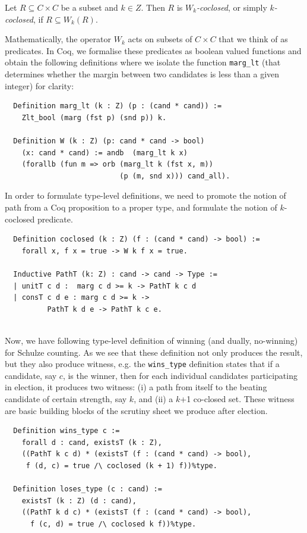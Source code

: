 \begin{definition} Let $R \subseteq C \times C$ be a subset and $k \in
Z$. Then $R$ is \emph{$W_k$-coclosed}, or simply
\emph{$k$-coclosed}, if $R \subseteq W_k(R)$.
\end{definition}

\noindent
Mathematically, the operator $W_k$ acts on subsets of $C \times C$
that we think of as predicates. In Coq, we formalise these
predicates as boolean valued functions and obtain the following
definitions where we isolate the function \texttt{marg\_lt} (that
determines whether the margin between two candidates is less than a
given integer) for clarity:


\begin{verbatim}
  Definition marg_lt (k : Z) (p : (cand * cand)) :=
    Zlt_bool (marg (fst p) (snd p)) k.

  Definition W (k : Z) (p: cand * cand -> bool) 
    (x: cand * cand) := andb  (marg_lt k x)
    (forallb (fun m => orb (marg_lt k (fst x, m)) 
                           (p (m, snd x))) cand_all).
\end{verbatim}

\noindent
In order to formulate type-level definitions, we need to promote the
notion of path from a Coq proposition to a proper type, and
formulate the notion of $k$-coclosed predicate.

\begin{verbatim} 
  Definition coclosed (k : Z) (f : (cand * cand) -> bool) :=
    forall x, f x = true -> W k f x = true.

  Inductive PathT (k: Z) : cand -> cand -> Type :=
  | unitT c d :  marg c d >= k -> PathT k c d
  | consT c d e : marg c d >= k -> 
          PathT k d e -> PathT k c e.
 
\end{verbatim}


\noindent
Now, we have following type-level definition of winning (and dually, 
no-winning) for Schulze counting. As we see that these definition not only produces 
the result, but they also produce witness, e.g. the \texttt{wins\_type} definition 
states that if a candidate, say $c$, is the winner,  
then for each individual candidates participating in election, it produces two witness:
(i) a path from itself to the beating candidate of certain strength, say $k$, and 
(ii) a $k$+1 co-closed set.  These witness are basic building blocks of the 
scrutiny sheet we produce after election. 

\begin{verbatim}
  Definition wins_type c := 
    forall d : cand, existsT (k : Z),
    ((PathT k c d) * (existsT (f : (cand * cand) -> bool),
     f (d, c) = true /\ coclosed (k + 1) f))%type.

  Definition loses_type (c : cand) := 
    existsT (k : Z) (d : cand),
    ((PathT k d c) * (existsT (f : (cand * cand) -> bool),
      f (c, d) = true /\ coclosed k f))%type.
\end{verbatim}

